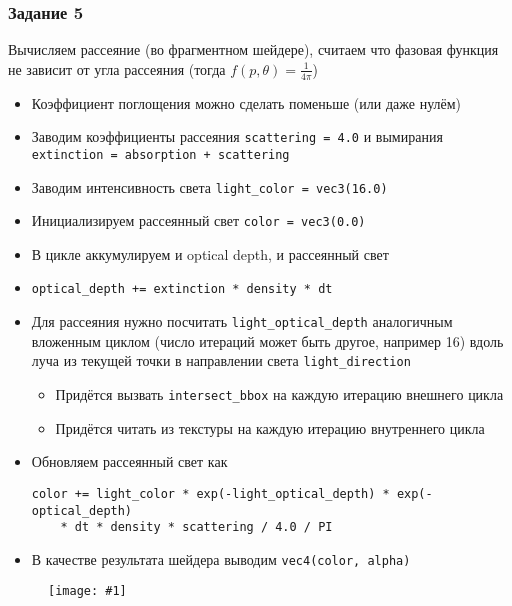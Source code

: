 \documentclass{beamer}
\newcommand{\slideimage}[1]{
  \begin{figure}
    \begin{adjustbox}{width=\textwidth, totalheight=\textheight-2\baselineskip-2\baselineskip,keepaspectratio}
      \texttt{[image: \#1]}
    \end{adjustbox}
  \end{figure}
}
\begin{document}
\begin{frame}[fragile]
\frametitle{Задание 5}
\fontsize{8pt}{8pt}\selectfont
Вычисляем рассеяние (во фрагментном шейдере), считаем что фазовая функция не зависит от угла рассеяния (тогда \begin{math}f(p,\theta) = \frac{1}{4\pi}\end{math})
\begin{itemize}
\item Коэффициент поглощения можно сделать поменьше (или даже нулём)
\item Заводим коэффициенты рассеяния \verb|scattering = 4.0| и вымирания \verb|extinction = absorption + scattering|
\item Заводим интенсивность света \verb|light_color = vec3(16.0)|
\item Инициализируем рассеянный свет \verb|color = vec3(0.0)|
\item В цикле аккумулируем и optical depth, и рассеянный свет
\item \verb|optical_depth += extinction * density * dt|
\item Для рассеяния нужно посчитать \verb|light_optical_depth| аналогичным вложенным циклом (число итераций может быть другое, например 16) вдоль луча из текущей точки в направлении света \verb|light_direction|
\begin{itemize}
\fontsize{8pt}{8pt}\selectfont
\item Придётся вызвать \verb|intersect_bbox| на каждую итерацию внешнего цикла
\item Придётся читать из текстуры на каждую итерацию внутреннего цикла
\end{itemize}
\item Обновляем рассеянный свет как \begin{verbatim}color += light_color * exp(-light_optical_depth) * exp(-optical_depth)
    * dt * density * scattering / 4.0 / PI\end{verbatim}
\item В качестве результата шейдера выводим \verb|vec4(color, alpha)|
\end{itemize}
\end{frame}

\begin{frame}[fragile]
\slideimage{5.png}
\end{frame}
\end{document}
